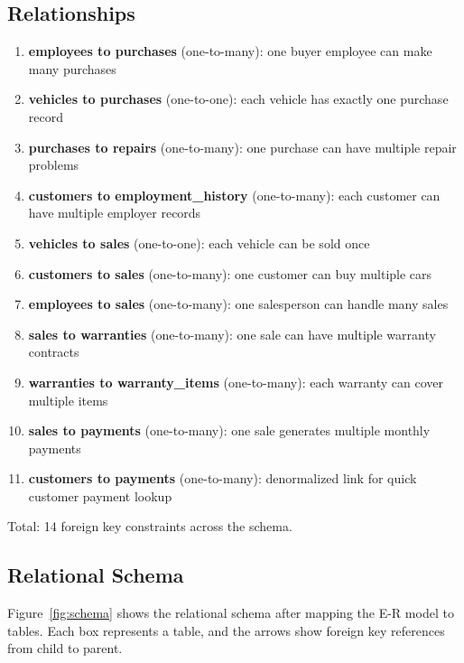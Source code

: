 \documentclass[12pt]{article}
\begin{document}
\subsection{Relationships}

\begin{enumerate}
  \item \textbf{employees to purchases} (one-to-many): one buyer employee can make many purchases
  \item \textbf{vehicles to purchases} (one-to-one): each vehicle has exactly one purchase record
  \item \textbf{purchases to repairs} (one-to-many): one purchase can have multiple repair problems
  \item \textbf{customers to employment\_history} (one-to-many): each customer can have multiple employer records
  \item \textbf{vehicles to sales} (one-to-one): each vehicle can be sold once
  \item \textbf{customers to sales} (one-to-many): one customer can buy multiple cars
  \item \textbf{employees to sales} (one-to-many): one salesperson can handle many sales
  \item \textbf{sales to warranties} (one-to-many): one sale can have multiple warranty contracts
  \item \textbf{warranties to warranty\_items} (one-to-many): each warranty can cover multiple items
  \item \textbf{sales to payments} (one-to-many): one sale generates multiple monthly payments
  \item \textbf{customers to payments} (one-to-many): denormalized link for quick customer payment lookup
\end{enumerate}

Total: 14 foreign key constraints across the schema.

\subsection{Relational Schema}

Figure~\ref{fig:schema} shows the relational schema after mapping the E-R model to tables. Each box represents a table, and the arrows show foreign key references from child to parent.
\end{document}
